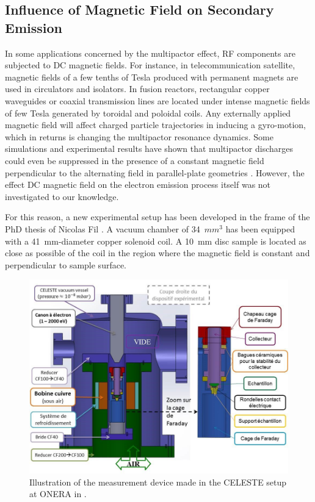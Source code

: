 \subsection[Influence of Magnetic Field]{Influence of Magnetic Field on Secondary Emission}\label{sec:multipactor_magnetic_field}
In some applications concerned by the multipactor effect, RF components are subjected to DC magnetic fields. For instance, in telecommunication satellite, magnetic fields of a few tenths of Tesla produced with permanent magnets are used in circulators and isolators. In fusion reactors, rectangular copper waveguides or coaxial transmission lines are located under intense magnetic fields of few Tesla generated by toroidal and poloidal coils. Any externally applied magnetic field will affect charged particle trajectories in inducing a gyro-motion, which in returns is changing the multipactor resonance dynamics. Some simulations and experimental results have  shown that multipactor discharges could even be suppressed in the presence of a constant magnetic field perpendicular to the alternating field in parallel-plate geometries . However, the effect DC magnetic field on the electron emission process itself was not investigated to our knowledge.

For this reason, a new experimental setup has been developed in the frame of the PhD thesis of Nicolas Fil . A vacuum chamber of 34~$\si{mm^3}$ has been equipped with a 41~\si{mm}-diameter copper solenoid coil. A 10~\si{mm} disc sample is located as close as possible of the coil in the region where the magnetic field is constant and perpendicular to sample surface. 


\begin{figure}[h]
	\centering
	\includegraphics[width=1.0\linewidth]{figures/chap4/CELESTE_magnetic_field}
	\caption{Illustration of the measurement device made in the CELESTE setup at ONERA in .}
	\label{fig:celestemagneticfield}
\end{figure}

